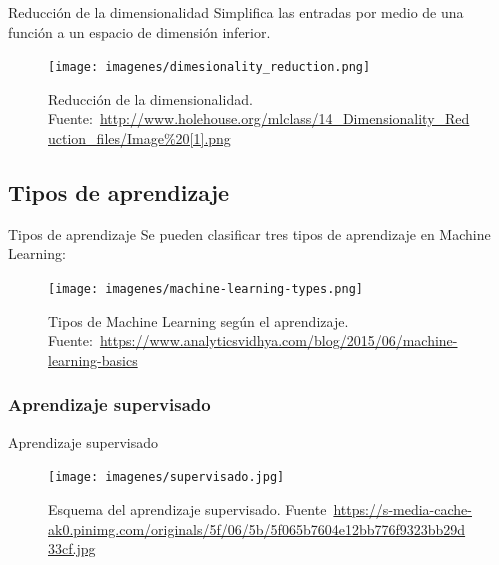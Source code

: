 \documentclass[hyperref={unicode}]{beamer}
\begin{document}
\begin{frame}{Reducción de la dimensionalidad}
	Simplifica las entradas por medio de una función a un espacio de dimensión inferior.
	
	\begin{figure}
			\begin{center}
			\texttt{[image: imagenes/dimesionality\_reduction.png]}
			\caption{Reducción de la dimensionalidad. Fuente:~\url{http://www.holehouse.org/mlclass/14_Dimensionality_Reduction_files/Image\%20[1].png}}
			\end{center}
	\end{figure}
			
\end{frame}


\subsection{Tipos de aprendizaje}
\begin{frame}{Tipos de aprendizaje}
	Se pueden clasificar tres tipos de aprendizaje en Machine Learning:
		
	\begin{figure}
				\begin{center}
				\texttt{[image: imagenes/machine-learning-types.png]}
				\caption{Tipos de Machine Learning según el aprendizaje. Fuente:~\url{https://www.analyticsvidhya.com/blog/2015/06/machine-learning-basics}}
				\end{center}
		\end{figure}
\end{frame}

\subsubsection{Aprendizaje supervisado}
\begin{frame}{Aprendizaje supervisado}

	\begin{figure}
					\begin{center}
					\texttt{[image: imagenes/supervisado.jpg]}
					\caption{Esquema del aprendizaje supervisado. Fuente~\url{https://s-media-cache-ak0.pinimg.com/originals/5f/06/5b/5f065b7604e12bb776f9323bb29d33cf.jpg}}
					\end{center}
			\end{figure}

\end{frame}
\end{document}
